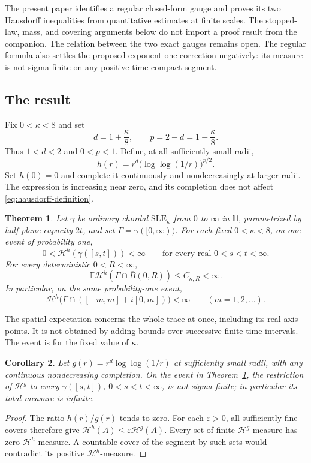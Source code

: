 \documentclass[11pt]{article}
\newtheorem{theorem}{Theorem}[section]
\newtheorem{corollary}[theorem]{Corollary}
\theoremstyle{definition}
\theoremstyle{remark}
\numberwithin{equation}{section}
\begin{document}
The present paper identifies a regular closed-form gauge and proves
its two Hausdorff inequalities from quantitative estimates at finite
scales. The stopped-law, mass, and covering arguments below do not
import a proof result from the companion. The relation between the
two exact gauges remains open.
The regular formula also settles the proposed exponent-one correction
negatively: its measure is not sigma-finite on any positive-time
compact segment.

\subsection{The result}

Fix $0<\kappa<8$ and set
\begin{equation}\label{eq:parameters}
 d=1+\frac\kappa8,\qquad p=2-d=1-\frac\kappa8.
\end{equation}
Thus $1<d<2$ and $0<p<1$. Define, at all sufficiently small radii,
\begin{equation}\label{eq:gauge}
 h(r)=r^d\bigl(\log\log(1/r)\bigr)^{p/2}.
\end{equation}
Set $h(0)=0$ and complete it continuously and nondecreasingly at
larger radii. The expression is increasing near zero, and its
completion does not affect \eqref{eq:hausdorff-definition}.

\begin{theorem}\label{thm:main}
Let $\gamma$ be ordinary chordal $\mathrm{SLE}_\kappa$ from $0$ to
$\infty$ in $\mathbb H$, parametrized by half-plane capacity $2t$,
and set $\Gamma=\gamma([0,\infty))$. For each fixed $0<\kappa<8$,
on one event of probability one,
\[
 0<\mathcal H^h(\gamma([s,t]))<\infty
 \qquad\text{for every real }0<s<t<\infty.
\]
For every deterministic $0<R<\infty$,
\[
 \mathbb E\mathcal H^h(\Gamma\cap\overline B(0,R))
       \le C_{\kappa,R}<\infty.
\]
In particular, on the same probability-one event,
\[
 \mathcal H^h\bigl(\Gamma\cap([-m,m]+i[0,m])\bigr)<\infty
 \qquad(m=1,2,\ldots).
\]
\end{theorem}

The spatial expectation concerns the whole trace at once, including
its real-axis points. It is not obtained by adding bounds over
successive finite time intervals. The event is for the fixed value
of $\kappa$.

\begin{corollary}\label{cor:larger-gauge}
Let $g(r)=r^d\log\log(1/r)$ at sufficiently small radii, with any
continuous nondecreasing completion. On the event in
Theorem~\ref{thm:main}, the restriction of $\mathcal H^g$ to every
$\gamma([s,t])$, $0<s<t<\infty$, is not sigma-finite; in particular
its total measure is infinite.
\end{corollary}
\begin{proof}
The ratio $h(r)/g(r)$ tends to zero. For each $\varepsilon>0$,
all sufficiently fine covers therefore give
$\mathcal H^h(A)\le\varepsilon\mathcal H^g(A)$.
Every set of finite $\mathcal H^g$-measure has zero
$\mathcal H^h$-measure. A countable cover of the segment by such sets
would contradict its positive $\mathcal H^h$-measure.
\end{proof}
\end{document}
